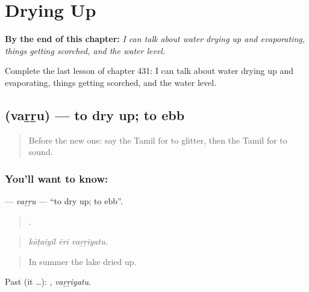
\chapter{Drying Up}
\label{ch:ta-drying-up}

\begin{chapteropening}
\textbf{By the end of this chapter:} \emph{I can talk about water drying up and evaporating, things getting scorched, and the water level.}

Complete the last lesson of chapter 431: I can talk about water drying up and evaporating, things getting scorched, and the water level.
\end{chapteropening}

\section[\texorpdfstring{\ta{வற்று} (vaṟṟu)}{வற்று (vaṟṟu)}]{ (vaṟṟu) — to dry up; to ebb}

\label{lesson:TA-C431-varru}



\begin{quote}
Before the new one: say the Tamil for to glitter, then the Tamil for to sound.
\end{quote}

\subsection*{You'll want to know: }
\textbf{} — \emph{vaṟṟu} — \textquotedblleft{}to dry up; to ebb\textquotedblright{}.

\begin{quote}
  .
\end{quote}

\begin{quote}
\emph{kōṭaiyil ēri vaṟṟiyatu.}
\end{quote}

\begin{quote}
In summer the lake dried up.
\end{quote}

Past (it …): , \emph{vaṟṟiyatu}.

